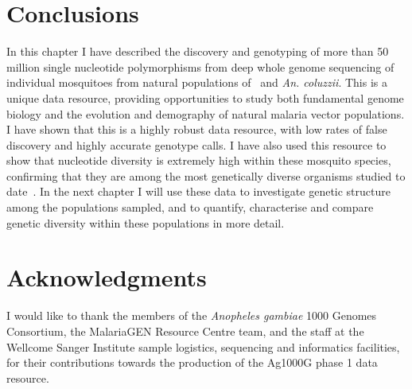 \begin{refsection}
\section{Conclusions}\label{sec:ch3-conclusions}


In this chapter I have described the discovery and genotyping of more than 50 million single nucleotide polymorphisms from deep whole genome sequencing of individual mosquitoes from natural populations of \agam\ and \textit{An. coluzzii}.
%
This is a unique data resource, providing opportunities to study both fundamental genome biology and the evolution and demography of natural malaria vector populations.
%
I have shown that this is a highly robust data resource, with low rates of false discovery and highly accurate genotype calls.
%
I have also used this resource to show that nucleotide diversity is extremely high within these mosquito species, confirming that they are among the most genetically diverse organisms studied to date~\parencite{Leffler2012}.
%
In the next chapter I will use these data to investigate genetic structure among the populations sampled, and to quantify, characterise and compare genetic diversity within these populations in more detail.


\section{Acknowledgments}\label{sec:ch3-acknowledgments}


I would like to thank the members of the \textit{Anopheles gambiae} 1000 Genomes Consortium, the MalariaGEN Resource Centre team, and the staff at the Wellcome Sanger Institute sample logistics, sequencing and informatics facilities, for their contributions towards the production of the Ag1000G phase 1 data resource.


\clearpage

\end{refsection}
